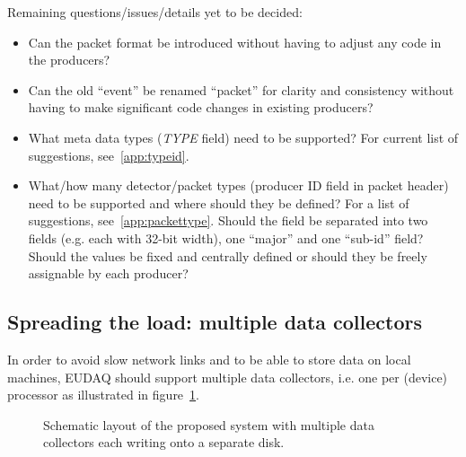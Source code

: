 \documentclass[paper=a4, fontsize=11pt]{scrartcl}	%
\numberwithin{equation}{section}		%
\numberwithin{figure}{section}			%
\numberwithin{table}{section}				%
\begin{document}
Remaining questions/issues/details yet to be decided:
\begin{itemize}
\item Can the packet format be introduced without having to adjust any
  code in the producers?
\item Can the old ``event'' be renamed ``packet'' for clarity and
  consistency without having to make significant code changes in
  existing producers?
\item What meta data types (\emph{TYPE} field) need to be supported?
  For current list of suggestions, see~\ref{app:typeid}.
\item What/how many detector/packet types (producer ID field in packet
  header) need to be supported and where should they be defined? For a list of suggestions,
  see~\ref{app:packettype}. Should the field be separated into two
  fields (e.g. each with 32-bit width), one ``major'' and one
  ``sub-id'' field? Should the values be fixed and centrally defined
  or should they be freely assignable by each producer?
\end{itemize}


\subsection{Spreading the load: multiple data collectors}
\label{sec:datacollectors}
In order to avoid slow network links and to be able to store data on
local machines, EUDAQ should support multiple data collectors,
i.e. one per (device) processor as illustrated in figure~\ref{fig:schematiclayout}.

\begin{figure}[htbp]
  \centering
  
  \caption{Schematic layout of the proposed system with multiple data
    collectors each writing onto a separate disk.}
\label{fig:schematiclayout}
\end{figure}
\end{document}
